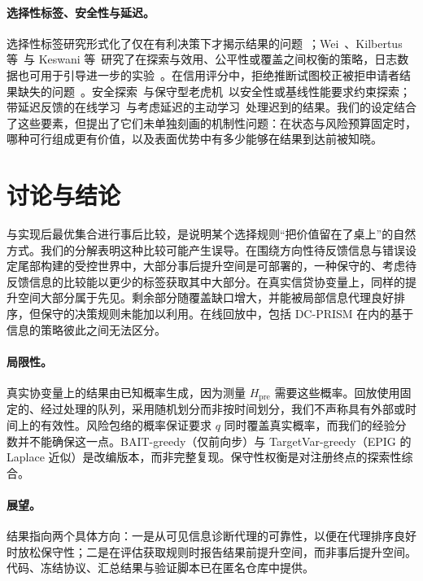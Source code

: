 \documentclass[runningheads]{llncs}
\begin{document}
\paragraph{选择性标签、安全性与延迟。}选择性标签研究形式化了仅在有利决策下才揭示结果的问题~\cite{lakkaraju2017selective}；Wei~\cite{wei2021selective}、Kilbertus 等~\cite{kilbertus2020fair}与 Keswani 等~\cite{keswani2024partial}研究了在探索与效用、公平性或覆盖之间权衡的策略，日志数据也可用于引导进一步的实验~\cite{yan2018logged}。在信用评分中，拒绝推断试图校正被拒申请者结果缺失的问题~\cite{crook2004reject}。安全探索~\cite{sui2015safe}与保守型老虎机~\cite{wu2016conservative}以安全性或基线性能要求约束探索；带延迟反馈的在线学习~\cite{joulani2013delayed,chapelle2014delayed}与考虑延迟的主动学习~\cite{pham2022latency}处理迟到的结果。我们的设定结合了这些要素，但提出了它们未单独刻画的机制性问题：在状态与风险预算固定时，哪种可行组成更有价值，以及表面优势中有多少能够在结果到达前被知晓。

\section{讨论与结论}
\label{sec:conclusion}
与实现后最优集合进行事后比较，是说明某个选择规则“把价值留在了桌上”的自然方式。我们的分解表明这种比较可能产生误导。在围绕方向性待反馈信息与错误设定尾部构建的受控世界中，大部分事后提升空间是可部署的，一种保守的、考虑待反馈信息的比较能以更少的标签获取其中大部分。在真实信贷协变量上，同样的提升空间大部分属于先见。剩余部分随覆盖缺口增大，并能被局部信息代理良好排序，但保守的决策规则未能加以利用。在线回放中，包括 DC-PRISM 在内的基于信息的策略彼此之间无法区分。

\paragraph{局限性。}真实协变量上的结果由已知概率生成，因为测量 $H_{\mathrm{pre}}$ 需要这些概率。回放使用固定的、经过处理的队列，采用随机划分而非按时间划分，我们不声称具有外部或时间上的有效性。风险包络的概率保证要求 $q$ 同时覆盖真实概率，而我们的经验分数并不能确保这一点。BAIT-greedy（仅前向步）与 TargetVar-greedy（EPIG 的 Laplace 近似）是改编版本，而非完整复现。保守性权衡是对注册终点的探索性综合。

\paragraph{展望。}结果指向两个具体方向：一是从可见信息诊断代理的可靠性，以便在代理排序良好时放松保守性；二是在评估获取规则时报告结果前提升空间，而非事后提升空间。代码、冻结协议、汇总结果与验证脚本已在匿名仓库中提供。



\end{document}
